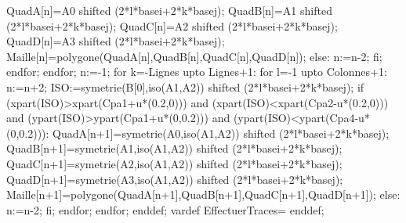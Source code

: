{  QuadA[n]=A0 shifted (2*l*basei+2*k*basej);
  QuadB[n]=A1 shifted (2*l*basei+2*k*basej);
  QuadC[n]=A2 shifted (2*l*basei+2*k*basej);
  QuadD[n]=A3 shifted (2*l*basei+2*k*basej);
  Maille[n]=polygone(QuadA[n],QuadB[n],QuadC[n],QuadD[n]);
  else:
  n:=n-2;
  fi;
  endfor;
  endfor;
  n:=-1;
  for k=-Lignes upto Lignes+1:
  for l=-1 upto Colonnes+1:
  n:=n+2;
  ISO:=symetrie(B[0],iso(A1,A2)) shifted (2*l*basei+2*k*basej);
  if (xpart(ISO)>xpart(Cpa1+u*(0.2,0))) and (xpart(ISO)<xpart(Cpa2-u*(0.2,0))) and (ypart(ISO)>ypart(Cpa1+u*(0,0.2))) and (ypart(ISO)<ypart(Cpa4-u*(0,0.2))):
  QuadA[n+1]=symetrie(A0,iso(A1,A2)) shifted (2*l*basei+2*k*basej);
  QuadB[n+1]=symetrie(A1,iso(A1,A2)) shifted (2*l*basei+2*k*basej);
  QuadC[n+1]=symetrie(A2,iso(A1,A2)) shifted (2*l*basei+2*k*basej);
  QuadD[n+1]=symetrie(A3,iso(A1,A2)) shifted (2*l*basei+2*k*basej);
  Maille[n+1]=polygone(QuadA[n+1],QuadB[n+1],QuadC[n+1],QuadD[n+1]);
  else:
  n:=n-2;
  fi;
  endfor;
  endfor;
  enddef;
  vardef EffectuerTraces=
  enddef;
}%

